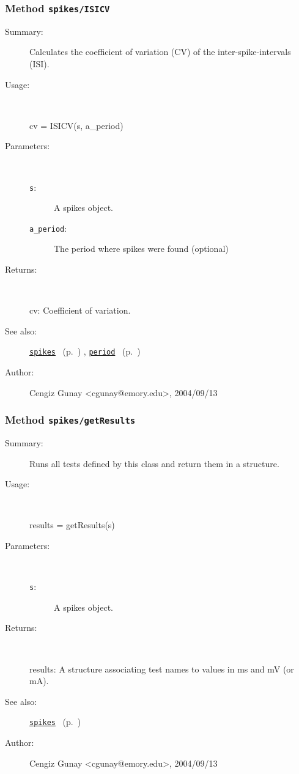 \subsubsection[Method \texttt{ISICV}]{Method \texttt{spikes/ISICV}}%
%
\label{ref_spikes__ISICV}%
\hypertarget{ref_spikes__ISICV}{}%
\begin{description}
\item[Summary:]Calculates the coefficient of variation (CV) of the 
	inter-spike-intervals (ISI).
%
\item[Usage:]~%
\begin{lyxcode}%
cv = ISICV(s, a\_period)
%
\end{lyxcode}%
%
%
\item[Parameters:]~
\begin{description}%
\item[\texttt{s}:]
 A spikes object.
\item[\texttt{a\_period}:]
 The period where spikes were found (optional)
\end{description}%
%
\item[Returns:]~

	cv: Coefficient of variation.
%
%
\item[See also:]%
\hyperlink{ref_spikes}{\texttt{spikes}}%
\ (p.~\pageref{ref_spikes})%
%
, \hyperlink{ref_period}{\texttt{period}}%
\ (p.~\pageref{ref_period})%
%
%
\item[Author:]%
Cengiz Gunay <cgunay@emory.edu>, 2004/09/13%
\end{description}
\methodline%
\subsubsection[Method \texttt{getResults}]{Method \texttt{spikes/getResults}}%
%
\label{ref_spikes__getResults}%
\hypertarget{ref_spikes__getResults}{}%
\begin{description}
\item[Summary:]Runs all tests defined by this class and return them in a 
		structure.
%
\item[Usage:]~%
\begin{lyxcode}%
results = getResults(s)
%
\end{lyxcode}%
%
%
\item[Parameters:]~
\begin{description}%
\item[\texttt{s}:]
 A spikes object.
\end{description}%
%
\item[Returns:]~

	results: A structure associating test names to values 
		in ms and mV (or mA).
%
%
\item[See also:]%
\hyperlink{ref_spikes}{\texttt{spikes}}%
\ (p.~\pageref{ref_spikes})%
%
%
\item[Author:]%
Cengiz Gunay <cgunay@emory.edu>, 2004/09/13%
\end{description}
\methodline%
